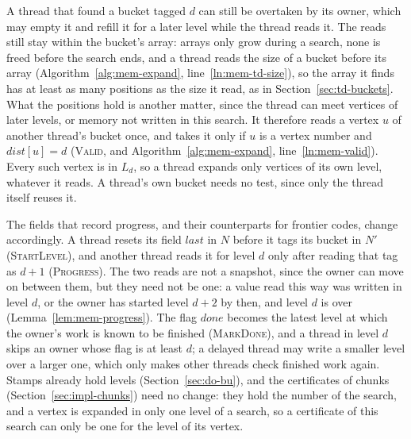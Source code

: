 A thread that found a bucket tagged $d$ can still be overtaken by its owner, which may empty it and refill it for a later level while the thread reads it. The reads still stay within the bucket's array: arrays only grow during a search, none is freed before the search ends, and a thread reads the size of a bucket before its array (Algorithm~\ref{alg:mem-expand}, line~\ref{ln:mem-td-size}), so the array it finds has at least as many positions as the size it read, as in Section~\ref{sec:td-buckets}. What the positions hold is another matter, since the thread can meet vertices of later levels, or memory not written in this search. It therefore reads a vertex $u$ of another thread's bucket once, and takes it only if $u$ is a vertex number and $\mathit{dist}[u] = d$ (\textsc{Valid}, and Algorithm~\ref{alg:mem-expand}, line~\ref{ln:mem-valid}). Every such vertex is in $L_d$, so a thread expands only vertices of its own level, whatever it reads. A thread's own bucket needs no test, since only the thread itself reuses it.

The fields that record progress, and their counterparts for frontier codes, change accordingly. A thread resets its field $\mathit{last}$ in $N$ before it tags its bucket in $N'$ (\textsc{StartLevel}), and another thread reads it for level $d$ only after reading that tag as $d+1$ (\textsc{Progress}). The two reads are not a snapshot, since the owner can move on between them, but they need not be one: a value read this way was written in level $d$, or the owner has started level $d+2$ by then, and level $d$ is over (Lemma~\ref{lem:mem-progress}). The flag $\mathit{done}$ becomes the latest level at which the owner's work is known to be finished (\textsc{MarkDone}), and a thread in level $d$ skips an owner whose flag is at least $d$; a delayed thread may write a smaller level over a larger one, which only makes other threads check finished work again. Stamps already hold levels (Section~\ref{sec:do-bu}), and the certificates of chunks (Section~\ref{sec:impl-chunks}) need no change: they hold the number of the search, and a vertex is expanded in only one level of a search, so a certificate of this search can only be one for the level of its vertex.


